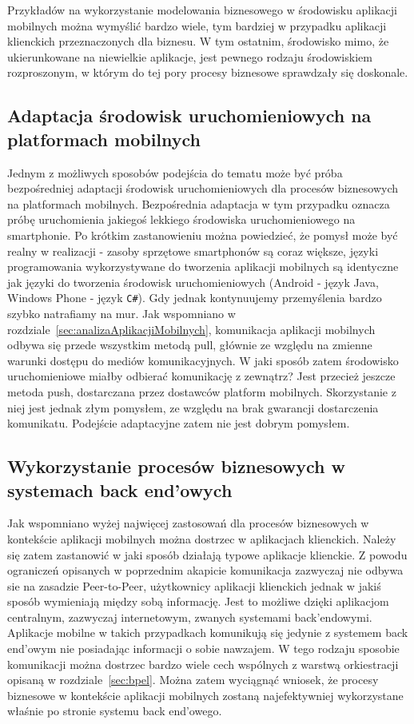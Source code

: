  Przykładów na wykorzystanie modelowania biznesowego w środowisku aplikacji mobilnych można wymyślić bardzo wiele, tym bardziej w przypadku aplikacji klienckich przeznaczonych dla biznesu. W tym ostatnim, środowisko mimo, że ukierunkowane na niewielkie aplikacje, jest pewnego rodzaju środowiskiem rozproszonym, w którym do tej pory procesy biznesowe sprawdzały się doskonale. 

\subsection{Adaptacja środowisk uruchomieniowych na platformach mobilnych}
\label{sec:adaptacjaProcesówNaPlatformyMobilne}

Jednym z możliwych sposobów podejścia do tematu może być próba bezpośredniej adaptacji środowisk uruchomieniowych dla procesów biznesowych na platformach mobilnych. Bezpośrednia adaptacja w tym przypadku oznacza próbę uruchomienia jakiegoś lekkiego środowiska uruchomieniowego na smartphonie. Po krótkim zastanowieniu można powiedzieć, że pomysł może być realny w realizacji - zasoby sprzętowe smartphonów są coraz większe, języki programowania wykorzystywane do tworzenia aplikacji mobilnych są identyczne jak języki do tworzenia środowisk uruchomieniowych (Android - język Java, Windows Phone - język \texttt{C\#}). Gdy jednak kontynuujemy przemyślenia bardzo szybko natrafiamy na mur. Jak wspomniano w rozdziale~\ref{sec:analizaAplikacjiMobilnych}, komunikacja aplikacji mobilnych odbywa się przede wszystkim metodą pull, głównie ze względu na zmienne warunki dostępu do mediów komunikacyjnych. W jaki sposób zatem środowisko uruchomieniowe miałby odbierać komunikację z zewnątrz? Jest przecież jeszcze metoda push, dostarczana przez dostawców platform mobilnych. Skorzystanie z niej jest jednak złym pomysłem, ze względu na brak gwarancji dostarczenia komunikatu. Podejście adaptacyjne zatem nie jest dobrym pomysłem. 


\subsection{Wykorzystanie procesów biznesowych w systemach back end'owych}
\label{sec:integracjaProcesówZAplikacjamiMobilnymi}

Jak wspomniano wyżej najwięcej zastosowań dla procesów biznesowych w kontekście aplikacji mobilnych można dostrzec w aplikacjach klienckich. Należy się zatem zastanowić w jaki sposób działają typowe aplikacje klienckie. Z powodu ograniczeń opisanych w poprzednim akapicie komunikacja zazwyczaj nie odbywa sie na zasadzie Peer-to-Peer, użytkownicy aplikacji klienckich jednak w jakiś sposób wymieniają między sobą informację. Jest to możliwe dzięki aplikacjom centralnym, zazwyczaj internetowym, zwanych systemami back'endowymi. Aplikacje mobilne w takich przypadkach komunikują się jedynie z systemem back end'owym nie posiadając informacji o sobie nawzajem. W tego rodzaju sposobie komunikacji można dostrzec bardzo wiele cech wspólnych z warstwą orkiestracji opisaną w rozdziale~\ref{sec:bpel}. Można zatem wyciągnąć wniosek, że procesy biznesowe w kontekście aplikacji mobilnych zostaną najefektywniej wykorzystane właśnie po stronie systemu back end'owego. 

